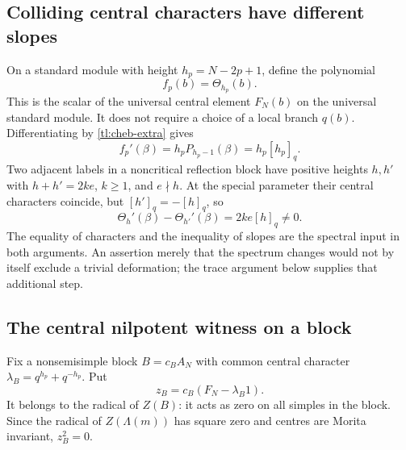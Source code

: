 \documentclass[a4paper,11pt,oneside,reqno]{amsart}
\theoremstyle{definition}
\numberwithin{equation}{section}
\begin{document}
	\subsection{Colliding central characters have different slopes}
	On a standard module with height $h_p=N-2p+1$, define the polynomial
	\[
	f_p(b)=\Theta_{h_p}(b).
	\]
	This is the scalar of the universal central element $F_N(b)$ on the
	universal standard module.  It does not require a choice of a local
	branch $q(b)$.  Differentiating by \eqref{tl:cheb-extra} gives
	\begin{equation}\label{tl:character-slope}
		f_p'(\beta)=h_pP_{h_p-1}(\beta)=h_p[h_p]_q.
	\end{equation}
	Two adjacent labels in a noncritical reflection block have positive
	heights $h,h'$ with $h+h'=2ke$, $k\ge1$, and $e\nmid h$.
	At the special parameter their central characters coincide, but
	$[h']_q=-[h]_q$, so
	\begin{equation}\label{tl:slope-gap}
		\boxed{\Theta_h'(\beta)-\Theta_{h'}'(\beta)
			=2ke[h]_q\ne0.}
	\end{equation}
	The equality of characters and the inequality of slopes are the
	spectral input in both arguments.  An assertion merely that the
	spectrum changes would not by itself exclude a trivial deformation;
	the trace argument below supplies that additional step.
	
	\subsection{The central nilpotent witness on a block}
	Fix a nonsemisimple block $B=c_BA_N$ with common central character
	$\lambda_B=q^{h_p}+q^{-h_p}$.  Put
	\begin{equation}\label{tl:zB}
		z_B=c_B(F_N-\lambda_B1).
	\end{equation}
	It belongs to the radical of $Z(B)$: it acts as zero on all simples
	in the block.  Since the radical of $Z(\Lambda(m))$ has square zero
	and centres are Morita invariant, $z_B^2=0$.
	
\end{document}
